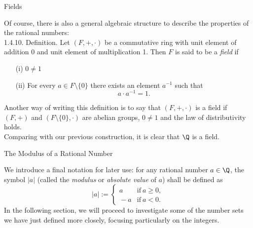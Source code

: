 \documentclass[smaller,hyperref={CJKbookmarks=true}]{beamer}
\begin{document}
\begin{frame}[c]{Fields}
\begin{spacing}{1}
Of course, there is also a general algebraic structure to describe the
properties of the rational numbers:\\[5pt]
\alert{1.4.10. Definition.} Let $(F,+,\cdot)$ be a commutative ring with unit element of addition 0 and unit element of multiplication 1. Then $F$ is said to be a \emph{field} if
\begin{itemize}
  \item[(i)] $0\neq1$
  \item[(ii)] For every $a\in F\setminus\{0\}$ there exists an element $a^{-1}$ such that
      \[a\cdot a^{-1}=1.\]
\end{itemize}
Another way of writing this definition is to say that $(F,+,\cdot)$ is a field if $(F,+)$ and $(F\setminus\{0\},\cdot)$ are abelian groups, $0\neq1$ and the law of distributivity holds.\\[4pt]
Comparing with our previous construction, it is clear that $\Q$ is a field.
\end{spacing}
\end{frame}
\begin{frame}[c]{The Modulus of a Rational Number}
\begin{spacing}{1.1}
We introduce a final notation for later use: for any rational number $a\in\Q$, the symbol $|a|$ (called the \emph{modulus} or \emph{absolute value} of $a$) shall be defined as
\[|a|:=\left\{\begin{array}{lc}
                \!\!a & \text{if}~a\geq0, \\
                \!\!-a & \text{if}~a<0.
              \end{array}\right.\]
In the following section, we will proceed to investigate some of the number
sets we have just defined more closely, focusing particularly on the integers.
\end{spacing}
\end{frame}
\end{document}
